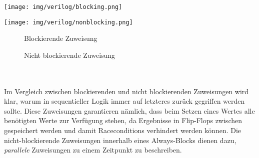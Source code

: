\begin{minipage}[H]{\textwidth} %
	\begin{minipage}[H]{\textwidth}
		\begin{minipage}[H]{0.5\textwidth}
			\texttt{[image: img/verilog/blocking.png]}
		\end{minipage}
		\begin{minipage}[H]{0.5\textwidth}
			\texttt{[image: img/verilog/nonblocking.png]}
		\end{minipage}
	\end{minipage}
	\begin{minipage}[H]{\textwidth}
		\begin{minipage}[H]{0.5\textwidth}
			\centering
			\begin{minipage}[H]{0.9\textwidth}
				\begin{figure}[H]
					\lstset{style=verilog-style}
					
					\caption{Blockierende Zuweisung} \label{blocking}
				\end{figure}
			\end{minipage}
		\end{minipage}	
		\begin{minipage}[H]{0.5\textwidth}
			\centering
			\begin{minipage}[H]{0.9\textwidth}
				\begin{figure}[H]
					\lstset{style=verilog-style}
					
					\caption{Nicht blockierende Zuweisung} \label{nonblocking}
				\end{figure}
			\end{minipage}
		\end{minipage}	
	\end{minipage}
\end{minipage}
\\\\
Im Vergleich zwischen blockierenden und nicht blockierenden Zuweisungen wird klar, warum in sequentieller Logik immer auf letzteres zurück gegriffen werden sollte. Diese Zuweisungen garantieren nämlich, dass beim Setzen eines Wertes alle benötigten Werte zur Verfügung stehen, da Ergebnisse in Flip-Flops zwischen gespeichert werden und damit Raceconditions verhindert werden können. Die nicht-blockierende Zuweisungen innerhalb eines Always-Blocks dienen dazu, \emph{parallele} Zuweisungen zu einem Zeitpunkt zu beschreiben.

